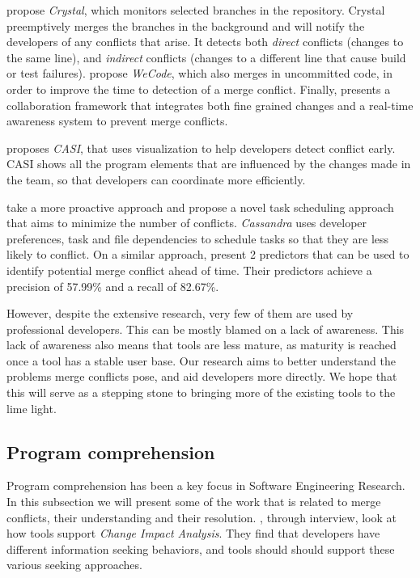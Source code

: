 \citet{Brun2011} propose \emph{Crystal}, which monitors selected branches in the repository. 
Crystal preemptively merges the branches in the background and will notify the developers of any conflicts that arise. 
It detects both \emph{direct} conflicts (changes to the same line), and \emph{indirect} conflicts (changes to a different line that cause build or test failures).
\citet{Guimaraes} propose \emph{WeCode}, which also merges in uncommitted code, in order to improve the time to detection of a merge conflict.
Finally, \citet{estler_unifying_2013} presents a collaboration framework that integrates both fine grained changes and a real-time awareness system to prevent merge conflicts.

\citet{servant_casi:_2010} proposes \emph{CASI}, that uses visualization to help developers detect conflict early.
CASI shows all the program elements that are influenced by the changes made in the team, so that developers can coordinate more efficiently.

\citet{kasi_cassandra:_2013} take a more proactive approach and propose a novel task scheduling approach that aims to minimize the number of conflicts. 
\emph{Cassandra} uses developer preferences, task and file dependencies to schedule tasks so that they are less likely to conflict.
On a similar approach, \citet{accioly_analyzing_2018} present 2 predictors that can be used to identify potential merge conflict ahead of time.
Their predictors achieve a precision of 57.99\% and a recall of 82.67\%.

However, despite the extensive research, very few of them are used by professional developers.
This can be mostly blamed on a lack of awareness.
This lack of awareness also means that tools are less mature, as maturity is reached once a tool has a stable user base.
Our research aims to better understand the problems merge conflicts pose, and aid developers more directly.
We hope that this will serve as a stepping stone to bringing more of the existing tools to the lime light.

\subsection{Program comprehension}
\label{sec:rw:pc}

Program comprehension has been a key focus in Software Engineering Research.
In this subsection we will present some of the work that is related to merge conflicts, their understanding and their resolution.
\citet{borg2017software}, through interview, look at how tools support \emph{Change Impact Analysis}. 
They find that developers have different information seeking behaviors, and tools should should support these various seeking approaches.

